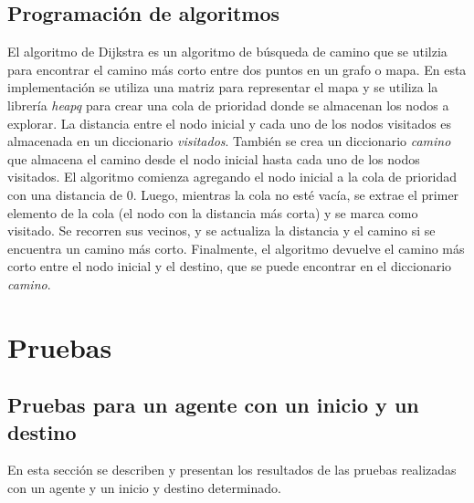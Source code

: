 \documentclass[12pt]{article}
\begin{document}
\subsection{Programación de algoritmos}
El algoritmo de Dijkstra es un algoritmo de búsqueda de camino que se utilzia para encontrar el camino 
más corto entre dos puntos en un grafo o mapa. En esta implementación se utiliza una matriz para 
representar el mapa y se utiliza la librería \textit{heapq} para crear una cola de prioridad donde se 
almacenan los nodos a explorar. La distancia entre el nodo inicial y cada uno de los nodos visitados 
es almacenada en un diccionario \textit{visitados}. También se crea un diccionario \textit{camino} que almacena el 
camino desde el nodo inicial hasta cada uno de los nodos visitados.
El algoritmo comienza agregando el nodo inicial a la cola de prioridad con una distancia de 0. Luego, 
mientras la cola no esté vacía, se extrae el primer elemento de la cola (el nodo con la distancia más 
corta) y se marca como visitado.
Se recorren sus vecinos, y se actualiza la distancia y el camino si se encuentra 
un camino más corto.
Finalmente, el algoritmo devuelve el camino más corto entre el nodo inicial y 
el destino, que se puede encontrar en el diccionario \textit{camino}.

\section{Pruebas}
\subsection{Pruebas para un agente con un inicio y un destino}
En esta sección se describen y presentan los resultados de las pruebas realizadas con un agente y un inicio y destino determinado.
\end{document}
